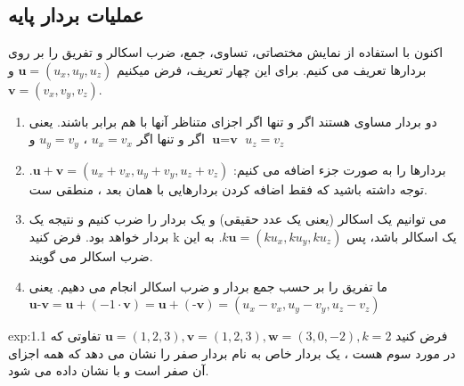 \subsection{\textbf{عملیات بردار پایه}}
\label{subsec:1.1.3}
{
    \Large
    \begin{spacing}{1.5}
        اکنون با استفاده از نمایش مختصاتی، تساوی، جمع، ضرب اسکالر و تفریق را بر روی بردارها تعریف می کنیم.
        برای این چهار تعریف، فرض میکنیم $\textbf{u}=(u_{x},u_{y},u_{z})$ و  $\textbf{v}=(v_{x},v_{y},v_{z})$.

        \begin{enumerate}[label=\textbf{\arabic*}.]
            \item {دو بردار مساوی هستند اگر و تنها اگر اجزای متناظر آنها با هم برابر باشند.
            یعنی $\textbf{u}=\textbf{v}$ اگر و تنها اگر $u_{x}=v_{x}$ ، $u_{y}=v_{y}$ و $u_{z}=v_{z}$}
            \item {بردارها را به صورت جزء اضافه می کنیم: $\textbf{u}+\textbf{v}=(u_{x}+v_{x},u_{y}+v_{y},u_{z}+v_{z})$.
            توجه داشته باشید که فقط اضافه کردن بردارهایی با همان بعد ، منطقی ست.}
            \item {می توانیم یک اسکالر (یعنی یک عدد حقیقی) و یک بردار را ضرب کنیم و نتیجه یک بردار خواهد بود.
            فرض کنید k یک اسکالر باشد، پس $k\textbf{u}=(ku_{x},ku_{y},ku_{z})$. به این ضرب اسکالر می گویند.}
            \item {ما تفریق را بر حسب جمع بردار و ضرب اسکالر انجام می دهیم.
            یعنی\\$\textbf{u}\textbf{-v}=\textbf{u}+(-1\cdot\textbf{v})=\textbf{u}+(\textbf{-v})=(u_{x}-v_{x},u_{y}-v_{y},u_{z}-v_{z})$}
        \end{enumerate}

        \textbf{\vspace{-10pt}}
        \begin{example}{exp:1.1}
            \Large
            فرض کنید $\textbf{u}=(1,2,3), \textbf{v}=(1,2,3), \textbf{w}=(3,0,-2), k=2$
            تفاوتی که در مورد سوم هست ، یک بردار خاص به نام بردار صفر را نشان می دهد که همه اجزای آن صفر است و با  نشان داده می شود.
        \end{example}


\end{spacing}}
